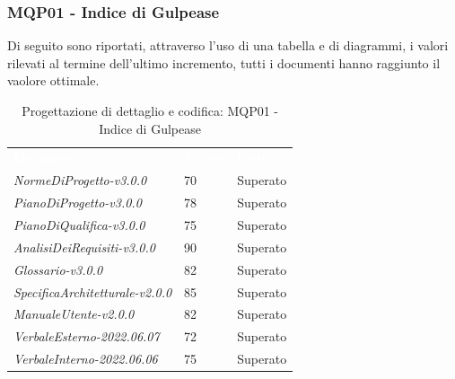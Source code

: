 \subsubsection{MQP01 - Indice di Gulpease}
Di seguito sono riportati, attraverso l'uso di una tabella e di diagrammi, i valori rilevati al termine dell'ultimo incremento, tutti i documenti hanno raggiunto il vaolore ottimale.
\begin{table}[H]
        \renewcommand{\arraystretch}{1.5}
        \begin{tabular}{m{}<{\centering}  m{}<{\centering}  m{}<{\centering} }
            \rowcolor{darkblue}
            \textcolor{white}{\textbf{Documento}}& \textcolor{white}{\textbf{Valore}} & \textcolor{white}{\textbf{Esito}}\\ 

            \textit{NormeDiProgetto-v3.0.0} &
            70 &
            Superato \\

            \textit{PianoDiProgetto-v3.0.0} &
            78 &
            Superato \\

            \textit{PianoDiQualifica-v3.0.0} &
            75 &
            Superato \\

            \textit{AnalisiDeiRequisiti-v3.0.0} &
            90 &
            Superato \\
            
            \textit{Glossario-v3.0.0} &
            82 &
            Superato \\
            \textit{SpecificaArchitetturale-v2.0.0} &
            85 &
            Superato \\
            \textit{ManualeUtente-v2.0.0} &
            82 &
            Superato \\

            \textit{VerbaleEsterno-2022.06.07} &
            72 &
            Superato \\
          
            \textit{VerbaleInterno-2022.06.06} &
            75&
            Superato \\
    \end{tabular}
    \caption{Progettazione di dettaglio e codifica: MQP01 - Indice di Gulpease}
\end{table}
